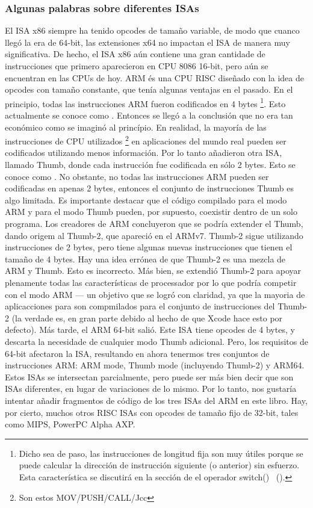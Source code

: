 %
%
%

\subsubsection{Algunas palabras sobre diferentes \ac{ISA}s}
El \ac{ISA} x86 siempre ha tenido opcodes de tamaño variable, de modo que cuanco llegó la era de 64-bit, las extensiones x64 no impactan el \ac{ISA} de manera muy significativa. De hecho, el \ac{ISA} x86 aún contiene una gran cantidade de instrucciones que primero aparecieron en CPU 8086 16-bit, pero aún se encuentran en las CPUs de hoy.
ARM és una \ac{CPU} \ac{RISC} diseñado con la idea de opcodes con tamaño constante, que tenía algunas ventajas en el pasado.
En el principio, todas las instrucciones ARM fueron codificados en 4 bytes%
\footnote{Dicho sea de paso, las instrucciones de longitud fija son muy útiles porque se puede calcular la dirección de instrucción siguiente (o anterior) sin esfuerzo. Esta característica se discutirá en la sección de el operador switch() ~().}.
Esto actualmente se conoce como .
Entonces se llegó a la conclusión que no era tan económico como se imaginó al princípio.
En realidad, la mayoría de las instrucciones de \ac{CPU} utilizados \footnote{Son estos MOV/PUSH/CALL/Jcc} en aplicaciones del mundo real pueden ser codificados utilizando menos información.
Por lo tanto añadieron otra \ac{ISA}, llamado Thumb, donde cada instrucción fue codificada en sólo 2 bytes.
Esto se conoce como .
No obstante, no todas las instrucciones ARM pueden ser codificadas en apenas 2 bytes, entonces el conjunto de instrucciones Thumb es algo limitada.
Es importante destacar que el código compilado para el modo ARM y para el modo Thumb pueden, por supuesto, coexistir dentro de un solo programa.
Los creadores de ARM concluyeron que se podría extender el Thumb, dando origem al Thumb-2, que apareció en el ARMv7.
Thumb-2 sigue utilizando instrucciones de 2 bytes, pero tiene algunas nuevas instrucciones que tienen el tamaño de 4 bytes.
Hay una idea errónea de que Thumb-2 es una mezcla de ARM y Thumb. Esto es incorrecto. 
Más bien, se extendió Thumb-2 para apoyar plenamente todas las características de processador por lo que podría 
competir con el modo ARM --- un objetivo que se logró con claridad, ya que la mayoria de aplicacciones para \idevices son compmilados para el conjunto de instrucciones del Thumb-2 (la verdade es, en gran parte debido al hecho de que Xcode hace esto por defecto).
Más tarde, el ARM 64-bit salió. Este \ac{ISA} tiene opcodes de 4 bytes, y descarta la necesidade de cualquier modo Thumb adicional.
Pero, los requisitos de 64-bit afectaron la \ac{ISA}, resultando en ahora tenermos tres conjuntos de instrucciones ARM: ARM mode, Thumb mode (incluyendo Thumb-2) y ARM64.
Estos \ac{ISA}s se intersectan parcialmente, pero puede ser más bien decir que son \ac{ISA}s diferentes, en lugar de variaciones de lo mismo.
Por lo tanto, nos gustaría intentar añadir fragmentos de código de los tres \ac{ISA}s del ARM en este libro.
%
%
%
Hay, por cierto, muchos otros \ac{RISC} \ac{ISA}s con opcodes de tamaño fijo de 32-bit, tales como MIPS, PowerPC \ESph{} Alpha AXP.
